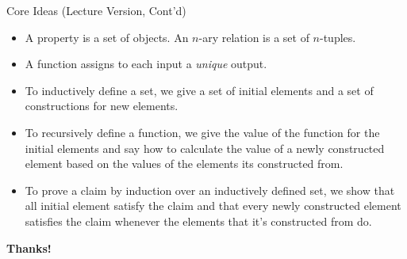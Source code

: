 \begin{frame}{Core Ideas (Lecture Version, Cont'd)}
	
\begin{itemize}
			
		\item A property is a set of objects. An $n$-ary relation is a set of $n$-tuples.
		
		\item A function assigns to each input a \emph{unique} output.
		
		\item To inductively define a set, we give a set of initial elements and a set of constructions for new elements.
		
		\item To recursively define a function, we give the value of the function for the initial elements and say how to calculate the value of a newly constructed element based on the values of the elements its constructed from.
		
		\item To prove a claim by induction over an inductively defined set, we show that all initial element satisfy the claim and that every newly constructed element satisfies the claim whenever the elements that it's constructed from do.
			

	\end{itemize}


\end{frame}

\begin{frame}

	\begin{center}
	{\huge\bf Thanks!}
	\end{center}

\end{frame}
